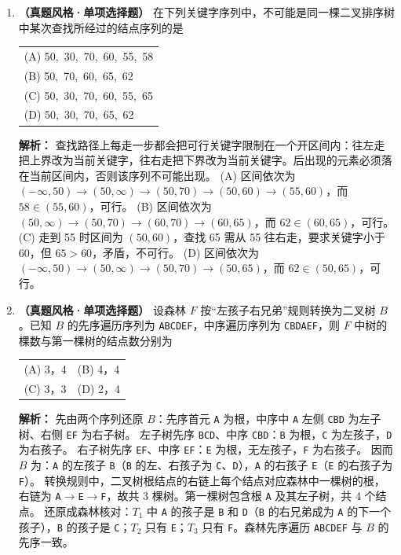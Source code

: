 \begin{enumerate}[resume]

\item \textbf{（真题风格·单项选择题）} 在下列关键字序列中，不可能是同一棵二叉排序树中某次查找所经过的结点序列的是
\begin{center}
\begin{tabularx}{0.96\linewidth}{@{}X@{}}
(A) 50,\ 30,\ 70,\ 60,\ 55,\ 58 \\[4pt]
(B) 50,\ 70,\ 60,\ 65,\ 62 \\[4pt]
(C) 50,\ 30,\ 70,\ 60,\ 55,\ 65 \\[4pt]
(D) 50,\ 30,\ 70,\ 65,\ 62
\end{tabularx}
\end{center}

\ifshowsolutions\par\noindent\textbf{解析：} 查找路径上每走一步都会把可行关键字限制在一个开区间内：往左走把上界改为当前关键字，往右走把下界改为当前关键字。后出现的元素必须落在当前区间内，否则该序列不可能出现。
(A) 区间依次为 $(-\infty,50)\to(50,\infty)\to(50,70)\to(50,60)\to(55,60)$，而 $58\in(55,60)$，可行。
(B) 区间依次为 $(50,\infty)\to(50,70)\to(60,70)\to(60,65)$，而 $62\in(60,65)$，可行。
(C) 走到 55 时区间为 $(50,60)$，查找 65 需从 55 往右走，要求关键字小于 60，但 $65>60$，矛盾，不可行。
(D) 区间依次为 $(-\infty,50)\to(50,\infty)\to(50,70)\to(50,65)$，而 $62\in(50,65)$，可行。
\else \answerarea[6] \fi

\item \textbf{（真题风格·单项选择题）} 设森林 $F$ 按“左孩子右兄弟”规则转换为二叉树 $B$。已知 $B$ 的先序遍历序列为 \texttt{ABCDEF}，中序遍历序列为 \texttt{CBDAEF}，则 $F$ 中树的棵数与第一棵树的结点数分别为
\begin{center}
\begin{tabular}{ll}
(A) 3，4 & (B) 4，4 \\[4pt]
(C) 3，3 & (D) 2，4
\end{tabular}
\end{center}

\ifshowsolutions\par\noindent\textbf{解析：} 先由两个序列还原 $B$：先序首元 \texttt{A} 为根，中序中 \texttt{A} 左侧 \texttt{CBD} 为左子树、右侧 \texttt{EF} 为右子树。
左子树先序 \texttt{BCD}、中序 \texttt{CBD}：\texttt{B} 为根，\texttt{C} 为左孩子，\texttt{D} 为右孩子。
右子树先序 \texttt{EF}、中序 \texttt{EF}：\texttt{E} 为根，无左孩子，\texttt{F} 为右孩子。
因而 $B$ 为：\texttt{A} 的左孩子 \texttt{B}（\texttt{B} 的左、右孩子为 \texttt{C}、\texttt{D}），\texttt{A} 的右孩子 \texttt{E}（\texttt{E} 的右孩子为 \texttt{F}）。
转换规则中，二叉树根结点的右链上每个结点对应森林中一棵树的根，右链为 \texttt{A}$\to$\texttt{E}$\to$\texttt{F}，故共 3 棵树。第一棵树包含根 \texttt{A} 及其左子树，共 4 个结点。
还原成森林核对：$T_1$ 中 \texttt{A} 的孩子是 \texttt{B} 和 \texttt{D}（\texttt{B} 的右兄弟成为 \texttt{A} 的下一个孩子），\texttt{B} 的孩子是 \texttt{C}；$T_2$ 只有 \texttt{E}；$T_3$ 只有 \texttt{F}。森林先序遍历 \texttt{ABCDEF} 与 $B$ 的先序一致。
\else \answerarea[6] \fi


\end{enumerate}
